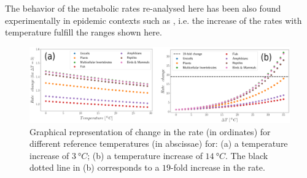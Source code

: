 The behavior of the metabolic rates re-analysed here has been also found
experimentally in epidemic contexts such as \cite{COELHO2006, Shapiro2017},
i.e. the increase of the rates with temperature fulfill the ranges shown here.

\begin{figure}[H]
    \centering
    \includegraphics[width=1\textwidth]{Figures/arrhenius.png}
    \caption{Graphical representation of change in the rate (in ordinates)
        for different reference temperatures (in abscissae) for: (a) a
        temperature
        increase of $\SI{3}{\degree C}$; (b)  a temperature increase of
        $\SI{14}{\degree C}$. The black dotted line in (b) corresponds to a
        $19$-fold
        increase in the rate.
    }
    \label{fig:rate_changes}
\end{figure}